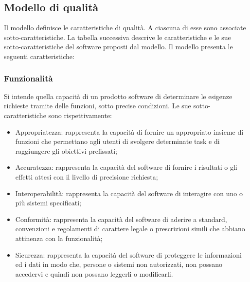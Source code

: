 \subsection{Modello di qualità}
Il modello definisce le caratteristiche di qualità. A ciascuna di esse sono associate sotto-caratteristiche. La tabella successiva descrive le caratteristiche e le sue sotto-caratteristiche del software proposti dal modello. 
Il modello presenta le seguenti caratteristiche:

\subsubsection{Funzionalità}
Si intende quella capacità di un prodotto software di determinare le esigenze richieste tramite delle funzioni, sotto precise condizioni.
Le sue sotto-caratteristiche sono rispettivamente:
\begin{itemize}
\item Appropriatezza: rappresenta la capacità di fornire un appropriato insieme di funzioni che permettano agli utenti di svolgere determinate task e di raggiungere gli obiettivi prefissati;
\item Accuratezza: rappresenta la capacità del software di fornire i risultati o gli effetti attesi con il livello di precisione richiesta;
\item Interoperabilità: rappresenta la capacità del software di interagire con uno o più sistemi specificati;
\item Conformità: rappresenta la capacità del software di aderire a standard, convenzioni e regolamenti di carattere legale o prescrizioni simili che abbiano attinenza con la funzionalità;
\item Sicurezza: rappresenta la capacità del software di proteggere le informazioni ed i dati in modo che, persone o sistemi non autorizzati, non possano accedervi e quindi non possano leggerli o modificarli.
\end{itemize}

